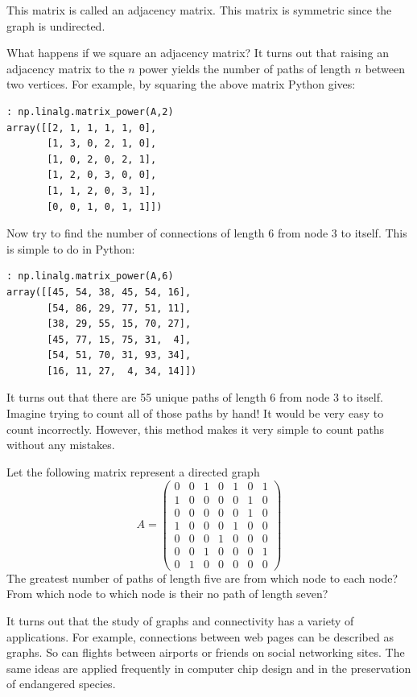 This matrix is called an adjacency matrix.
This matrix is symmetric since the graph is undirected.

What happens if we square an adjacency matrix?
It turns out that raising an adjacency matrix to the $n$ power yields the number of paths of length $n$ between two vertices.
For example, by squaring the above matrix Python gives:
\begin{lstlisting}
: np.linalg.matrix_power(A,2)
array([[2, 1, 1, 1, 1, 0],
       [1, 3, 0, 2, 1, 0],
       [1, 0, 2, 0, 2, 1],
       [1, 2, 0, 3, 0, 0],
       [1, 1, 2, 0, 3, 1],
       [0, 0, 1, 0, 1, 1]])
\end{lstlisting}

Now try to find the number of connections of length 6 from node 3 to itself.
This is simple to do in Python:
\begin{lstlisting}
: np.linalg.matrix_power(A,6)
array([[45, 54, 38, 45, 54, 16],
       [54, 86, 29, 77, 51, 11],
       [38, 29, 55, 15, 70, 27],
       [45, 77, 15, 75, 31,  4],
       [54, 51, 70, 31, 93, 34],
       [16, 11, 27,  4, 34, 14]])
\end{lstlisting}
It turns out that there are 55 unique paths of length 6 from node 3 to itself.
Imagine trying to count all of those paths by hand!
It would be very easy to count incorrectly.
However, this method makes it very simple to count paths without any mistakes.

\begin{problem}
Let the following matrix represent a directed graph
\[
A = \begin{pmatrix}
0 & 0 & 1 & 0 & 1 & 0 & 1\\
1 & 0 & 0 & 0 & 0 & 1 & 0\\
0 & 0 & 0 & 0 & 0 & 1 & 0\\
1 & 0 & 0 & 0 & 1 & 0 & 0\\
0 & 0 & 0 & 1 & 0 & 0 & 0\\
0 & 0 & 1  & 0 & 0& 0 & 1\\
0 & 1 & 0 & 0 & 0 & 0 & 0
\end{pmatrix}
\]
The greatest number of paths of length five are from which node to each node?
From which node to which node is their no path of length seven?
\end{problem}

It turns out that the study of graphs and connectivity has a variety of applications.
For example, connections between web pages can be described as graphs.
So can flights between airports or friends on social networking sites.
The same ideas are applied frequently in computer chip design and in the preservation of endangered species.

